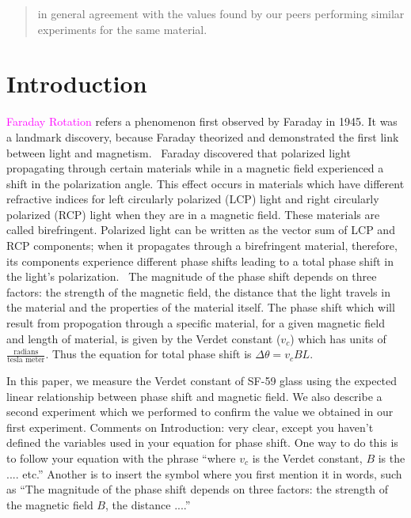 \documentclass[prb,preprint]{revtex4-1}
\begin{document}
\begin{abstract}
in general agreement with the values found by our peers performing similar experiments for the same material. 

\end{abstract}

\maketitle %


\section{Introduction} %

\textcolor{magenta}{Faraday Rotation} refers a phenomenon first observed by Faraday in 1945. It was a landmark discovery, because Faraday theorized and demonstrated the first link between light and magnetism.~\cite{teachspin} Faraday discovered that polarized light propagating through certain materials while in a magnetic field experienced a shift in the polarization angle. This effect occurs in materials which have different refractive indices for left circularly polarized (LCP) light and right circularly polarized (RCP) light when they are in a magnetic field. These materials are called birefringent. Polarized light can be written as the vector sum of LCP and RCP components; when it propagates through a birefringent material, therefore, its components experience different phase shifts leading to a total phase shift in the light's polarization.~\cite{melissanos} The magnitude of the phase shift depends on three factors: the strength of the magnetic field, the distance that the light travels in the material and the properties of the material itself. The phase shift which will result from propogation through a specific material, for a given magnetic field and length of material, is given by the Verdet constant ($v_c$) which has units of $\frac{\text{radians}}{\text{tesla\ meter}}$. Thus the equation for total phase shift is $\Delta \theta = v_c B L$.



In this paper, we measure the Verdet constant of SF-59 glass using the expected linear relationship between phase shift and magnetic field. We also describe a second experiment which we performed to confirm the value we obtained in our first experiment.
{\color{blue}Comments on Introduction: very clear, except you haven't defined the variables used in your equation for phase shift. One way to do this is to follow your equation with the phrase ``where $v_c$ is the Verdet constant, $B$ is the .... etc.''  Another is to insert the symbol where you first mention it in words, such as ``The magnitude of the phase shift depends on three factors: the strength of the magnetic field $B$, the distance ....''}
\end{document}
